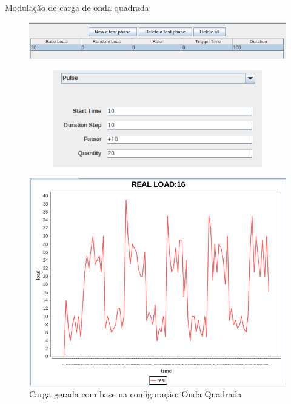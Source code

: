 \begin{frame}{Modulação de carga de onda quadrada}
	\begin{figure}
		\centering
		\includegraphics[scale=0.43]{../monograph/images/condiguracao-carga-bench4q3.png}
	\end{figure}
	\begin{figure}
		\centering
		\begin{minipage}{.35\textwidth}
			\begin{figure}
				\centering
				\includegraphics[scale=0.37]{../monograph/images/condiguracao-carga-modulada3.png}
			\end{figure}
		\end{minipage}
		\begin{minipage}{.45\textwidth}
			\includegraphics[scale=0.35]{../monograph/images/grafico-carga-modulada3.png}			
		\end{minipage}
		\caption{Carga gerada com base na configuração: Onda Quadrada}
	\end{figure}	
\end{frame}